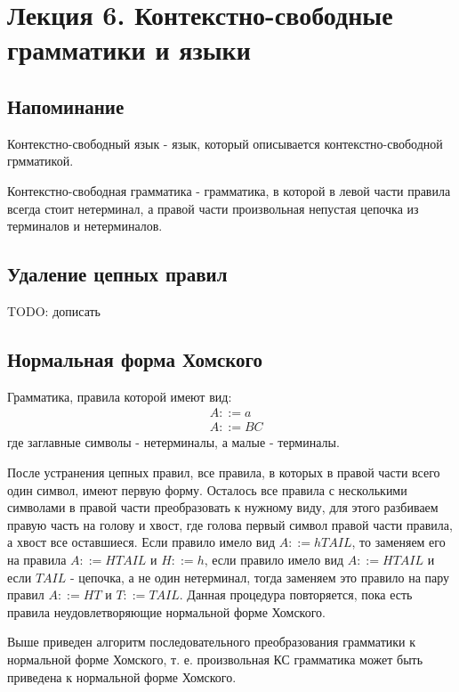 \chapter{Лекция 6. Контекстно-свободные грамматики и языки}

\section{Напоминание}

\begin{Def}
Контекстно-свободный язык - язык, который описывается контекстно-свободной грмматикой.
\end{Def}

\begin{Def}
Контекстно-свободная грамматика - грамматика, в которой в левой части правила всегда стоит нетерминал, а правой части произвольная непустая цепочка
из терминалов и нетерминалов.
\end{Def}

\section{Удаление цепных правил}

TODO: дописать

\section{Нормальная форма Хомского}

Грамматика, правила которой имеют вид:
\[
	\begin{split}
		&A ::= a\\
		&A ::= BC
	\end{split}
\]
где заглавные символы - нетерминалы, а малые - терминалы.

После устранения цепных правил, все правила, в которых в правой части всего один символ, имеют первую форму. Осталось все правила с несколькими символами
в правой части преобразовать к нужному виду, для этого разбиваем правую часть на голову и хвост, где голова первый символ правой части правила, а хвост
все оставшиеся. Если правило имело вид $A ::= h TAIL$, то заменяем его на правила $A ::= H TAIL$ и $H ::= h$, если правило имело вид $A ::= H TAIL$ и если
$TAIL$ - цепочка, а не один нетерминал, тогда заменяем это правило на пару правил $A ::= H T$ и $T ::= TAIL$. Данная процедура повторяется, пока есть правила
неудовлетворяющие нормальной форме Хомского.

Выше приведен алгоритм последовательного преобразования грамматики к нормальной форме Хомского, т. е. произвольная КС грамматика может быть приведена к нормальной
форме Хомского.

